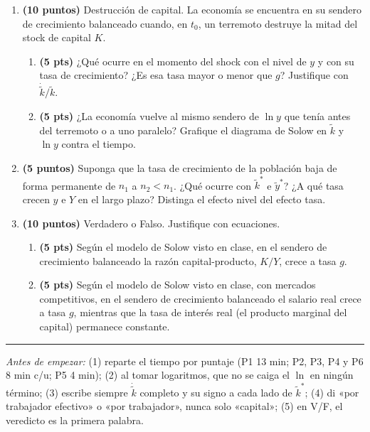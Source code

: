 \documentclass[11pt]{article}
\begin{document}
\begin{enumerate}[leftmargin=*, itemsep=12pt]
\item \textbf{(10 puntos)} Destrucción de capital. La economía se encuentra en su sendero de crecimiento balanceado cuando, en $t_0$, un terremoto destruye la mitad del stock de capital $K$.
\begin{enumerate}[label=\alph*), leftmargin=*, itemsep=4pt]
\item \textbf{(5 pts)} ¿Qué ocurre en el momento del shock con el nivel de $y$ y con su tasa de crecimiento? ¿Es esa tasa mayor o menor que $g$? Justifique con $\dot{\tilde k}/\tilde k$.
\item \textbf{(5 pts)} ¿La economía vuelve al mismo sendero de $\ln y$ que tenía antes del terremoto o a uno paralelo? Grafique el diagrama de Solow en $\tilde k$ y $\ln y$ contra el tiempo.
\end{enumerate}

\item \textbf{(5 puntos)} Suponga que la tasa de crecimiento de la población baja de forma permanente de $n_1$ a $n_2 < n_1$. ¿Qué ocurre con $\tilde k^{*}$ e $\tilde y^{*}$? ¿A qué tasa crecen $y$ e $Y$ en el largo plazo? Distinga el efecto nivel del efecto tasa.

\item \textbf{(10 puntos)} Verdadero o Falso. Justifique con ecuaciones.
\begin{enumerate}[label=\alph*), leftmargin=*, itemsep=4pt]
\item \textbf{(5 pts)} Según el modelo de Solow visto en clase, en el sendero de crecimiento balanceado la razón capital-producto, $K/Y$, crece a tasa $g$.
\item \textbf{(5 pts)} Según el modelo de Solow visto en clase, con mercados competitivos, en el sendero de crecimiento balanceado el salario real crece a tasa $g$, mientras que la tasa de interés real (el producto marginal del capital) permanece constante.
\end{enumerate}

\end{enumerate}

\medskip
\hrule
\smallskip
{\small\textit{Antes de empezar:} (1) reparte el tiempo por puntaje (P1 13 min; P2, P3, P4 y P6 8 min c/u; P5 4 min); (2) al tomar logaritmos, que no se caiga el $\ln$ en ningún término; (3) escribe siempre $\dot{\tilde k}$ completo y su signo a cada lado de $\tilde k^{*}$; (4) di «por trabajador efectivo» o «por trabajador», nunca solo «capital»; (5) en V/F, el veredicto es la primera palabra.}
\end{document}
